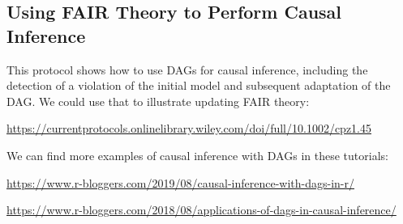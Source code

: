 \documentclass[
  man]{apa6}
\begin{document}
\subsection{Using FAIR Theory to Perform Causal Inference}\label{using-fair-theory-to-perform-causal-inference}

This protocol shows how to use DAGs for causal inference, including the detection of a violation of the initial model and subsequent adaptation of the DAG. We could use that to illustrate updating FAIR theory:

\url{https://currentprotocols.onlinelibrary.wiley.com/doi/full/10.1002/cpz1.45}

We can find more examples of causal inference with DAGs in these tutorials:

\url{https://www.r-bloggers.com/2019/08/causal-inference-with-dags-in-r/}

\url{https://www.r-bloggers.com/2018/08/applications-of-dags-in-causal-inference/}
\end{document}
